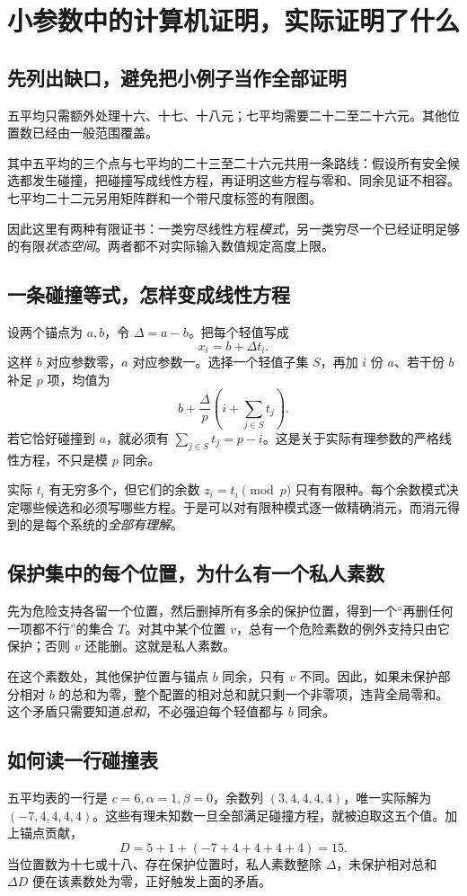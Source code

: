 \chapter{小参数中的计算机证明，实际证明了什么}\label{app:small}
\section{先列出缺口，避免把小例子当作全部证明}
五平均只需额外处理十六、十七、十八元；七平均需要二十二至二十六元。其他位置数已经由一般范围覆盖。

其中五平均的三个点与七平均的二十三至二十六元共用一条路线：假设所有安全候选都发生碰撞，把碰撞写成线性方程，再证明这些方程与零和、同余见证不相容。七平均二十二元另用矩阵群和一个带尺度标签的有限图。

因此这里有两种有限证书：一类穷尽线性方程\emph{模式}，另一类穷尽一个已经证明足够的有限\emph{状态空间}。两者都不对实际输入数值规定高度上限。

\section{一条碰撞等式，怎样变成线性方程}
设两个锚点为 $a,b$，令 $\Delta=a-b$。把每个轻值写成
\[x_i=b+\Delta t_i.
\]
这样 $b$ 对应参数零，$a$ 对应参数一。选择一个轻值子集 $S$，再加 $i$ 份 $a$、若干份 $b$ 补足 $p$ 项，均值为
\[b+\frac{\Delta}{p}\left(i+\sum_{j\in S}t_j\right).
\]
若它恰好碰撞到 $a$，就必须有 $\sum_{j\in S}t_j=p-i$。这是关于实际有理参数的严格线性方程，不只是模 $p$ 同余。

实际 $t_i$ 有无穷多个，但它们的余数 $z_i=t_i\pmod p$ 只有有限种。每个余数模式决定哪些候选和必须写哪些方程。于是可以对有限种模式逐一做精确消元，而消元得到的是每个系统的\emph{全部有理解}。

\section{保护集中的每个位置，为什么有一个私人素数}
先为危险支持各留一个位置，然后删掉所有多余的保护位置，得到一个“再删任何一项都不行”的集合 $T$。对其中某个位置 $v$，总有一个危险素数的例外支持只由它保护；否则 $v$ 还能删。这就是私人素数。

在这个素数处，其他保护位置与锚点 $b$ 同余，只有 $v$ 不同。因此，如果未保护部分相对 $b$ 的总和为零，整个配置的相对总和就只剩一个非零项，违背全局零和。这个矛盾只需要知道\emph{总和}，不必强迫每个轻值都与 $b$ 同余。

\section{如何读一行碰撞表}
五平均表的一行是 $c=6,\alpha=1,\beta=0$，余数列 $(3,4,4,4,4)$，唯一实际解为 $(-7,4,4,4,4)$。这些有理未知数一旦全部满足碰撞方程，就被迫取这五个值。加上锚点贡献，
\[D=5+1+(-7+4+4+4+4)=15.
\]
当位置数为十七或十八、存在保护位置时，私人素数整除 $\Delta$，未保护相对总和 $\Delta D$ 便在该素数处为零，正好触发上面的矛盾。

